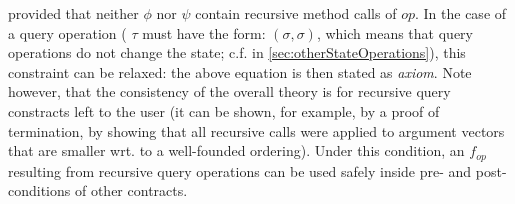 provided that neither $\phi$  nor $\psi$ contain recursive method calls of $\mathit{op}$.
In the case of a query operation (\ie{} $\tau$ must have the form: $(\sigma,\sigma)$, which
means that query operations do not change the state; c.f.  in 
\autoref{sec:otherStateOperations}), this constraint can be relaxed: the above
equation is then stated as \emph{axiom}. Note however, that the consistency of the overall 
theory is for recursive query constracts left to the user (it can be shown, for example, by a proof 
of termination, \ie{} by showing that all recursive calls were applied to  argument vectors that are 
smaller wrt. to a well-founded ordering). Under this condition, an $f_{op}$ resulting from recursive 
query operations can be used safely inside pre- and post-conditions of other contracts.

